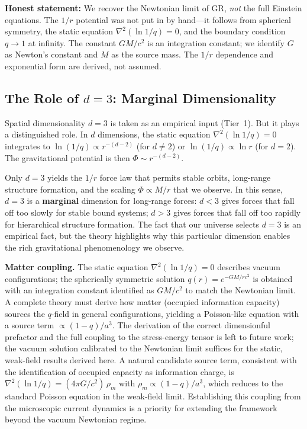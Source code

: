 \documentclass[aps,prd,twocolumn,showpacs,superscriptaddress,preprintnumbers]{revtex4-2}
\begin{document}
\textbf{Honest statement:} We recover the Newtonian limit of GR, \emph{not} the full Einstein equations.
The $1/r$ potential was not put in by hand---it follows from spherical symmetry, the static equation $\nabla^2(\ln 1/q)=0$, and the boundary condition $q\to1$ at infinity.
The constant $GM/c^2$ is an integration constant; we identify $G$ as Newton's constant and $M$ as the source mass.
The $1/r$ dependence and exponential form are derived, not assumed.

\subsection{The Role of $d=3$: Marginal Dimensionality}
\label{sec:d3}

Spatial dimensionality $d=3$ is taken as an empirical input (Tier~1).
But it plays a distinguished role.
In $d$ dimensions, the static equation $\nabla^2(\ln 1/q)=0$ integrates to $\ln(1/q)\propto r^{-(d-2)}$ (for $d\neq2$) or $\ln(1/q)\propto\ln r$ (for $d=2$).
The gravitational potential is then $\Phi\sim r^{-(d-2)}$.

Only $d=3$ yields the $1/r$ force law that permits stable orbits, long-range structure formation, and the scaling $\Phi\propto M/r$ that we observe.
In this sense, $d=3$ is a \textbf{marginal} dimension for long-range forces: $d<3$ gives forces that fall off too slowly for stable bound systems; $d>3$ gives forces that fall off too rapidly for hierarchical structure formation.
The fact that our universe selects $d=3$ is an empirical fact, but the theory highlights why this particular dimension enables the rich gravitational phenomenology we observe.

\textbf{Matter coupling.}
The static equation $\nabla^2(\ln 1/q)=0$ describes vacuum configurations; the spherically symmetric solution $q(r)=e^{-GM/rc^2}$ is obtained with an integration constant identified as $GM/c^2$ to match the Newtonian limit.
A complete theory must derive how matter (occupied information capacity) sources the $q$-field in general configurations, yielding a Poisson-like equation with a source term $\propto(1-q)/a^3$.
The derivation of the correct dimensionful prefactor and the full coupling to the stress-energy tensor is left to future work; the vacuum solution calibrated to the Newtonian limit suffices for the static, weak-field results derived here.
A natural candidate source term, consistent with the identification of occupied capacity as information charge, is $\nabla^2(\ln 1/q) = (4\pi G/c^2)\,\rho_m$ with $\rho_m \propto (1-q)/a^3$, which reduces to the standard Poisson equation in the weak-field limit.
Establishing this coupling from the microscopic current dynamics is a priority for extending the framework beyond the vacuum Newtonian regime.
\end{document}
